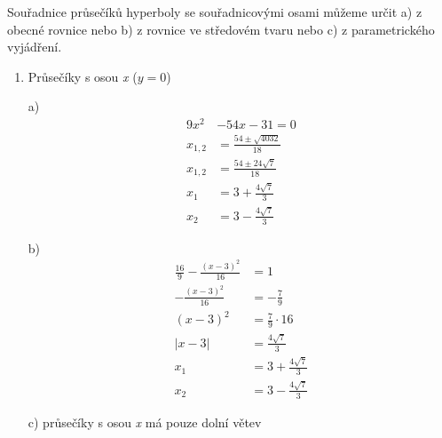 			Souřadnice průsečíků hyperboly se souřadnicovými osami můžeme určit a) z obecné rovnice nebo b) z rovnice ve středovém tvaru
			nebo c) z parametrického vyjádření.
			\begin{enumerate}
				\item Průsečíky s osou \textit{x} ($y=0$) \\
				      \small
				      \begin{minipage}[t]{0.5\textwidth}
				      	a)
				      	\begin{align*}
				      		9x^2    & -54x-31=0                     \\
				      		x_{1,2} & = \frac{54\pm\sqrt{4032}}{18} \\
				      		x_{1,2} & = \frac{54\pm24\sqrt{7}}{18}  \\
				      		x_1     & = 3 + \frac{4\sqrt{7}}{3}     \\
				      		x_2     & = 3 - \frac{4\sqrt{7}}{3}     
				      	\end{align*}
				      \end{minipage}
				      \begin{minipage}[t]{0.5\textwidth}
				      	b)
				      	\begin{align*}
				      		\frac{16}{9}-\frac{(x-3)^2}{16} & = 1                       \\
				      		-\frac{(x-3)^2}{16}             & = -\frac{7}{9}            \\
				      		(x-3)^2                         & = \frac{7}{9}\cdot16      \\
				      		|x-3|                           & = \frac{4\sqrt{7}}{3}     \\
				      		x_1                             & = 3 + \frac{4\sqrt{7}}{3} \\
				      		x_2                             & = 3 - \frac{4\sqrt{7}}{3} 
				      	\end{align*}
				      \end{minipage}
				      c) průsečíky s osou \textit{x} má pouze dolní větev
				      				      

\end{enumerate}
